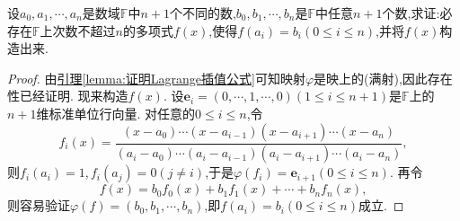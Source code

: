 \documentclass[../../main.tex]{subfiles}%
\begin{document}
\begin{theorem}[Lagrange插值公式]\label{theorem:Lagrange插值公式}
设\(a_0,a_1,\cdots,a_n\)是数域\(\mathbb{F}\)中\(n + 1\)个不同的数,\(b_0,b_1,\cdots,b_n\)是\(\mathbb{F}\)中任意\(n + 1\)个数,求证:必存在\(\mathbb{F}\)上次数不超过\(n\)的多项式\(f(x)\),使得\(f(a_i)=b_i(0\leqslant  i\leqslant  n)\),并将\(f(x)\)构造出来.
\end{theorem}
\begin{proof}
由\hyperref[lemma:证明Lagrange插值公式]{引理\ref{lemma:证明Lagrange插值公式}}可知映射\(\varphi\)是映上的(满射),因此存在性已经证明. 现来构造\(f(x)\). 设\(\boldsymbol{e}_i=(0,\cdots,1,\cdots,0)(1\leqslant  i\leqslant  n + 1)\)是\(\mathbb{F}\)上的\(n + 1\)维标准单位行向量. 对任意的\(0\leqslant  i\leqslant  n\),令
\[
f_i(x)=\frac{(x - a_0)\cdots(x - a_{i - 1})(x - a_{i + 1})\cdots(x - a_n)}{(a_i - a_0)\cdots(a_i - a_{i - 1})(a_i - a_{i + 1})\cdots(a_i - a_n)},
\]
则\(f_i(a_i)=1,f_i(a_j)=0(j\neq i)\),于是\(\varphi(f_i)=\boldsymbol{e}_{i + 1}(0\leqslant  i\leqslant  n)\). 再令
\[
f(x)=b_0f_0(x)+b_1f_1(x)+\cdots + b_nf_n(x),
\]
则容易验证\(\varphi(f)=(b_0,b_1,\cdots,b_n)\),即\(f(a_i)=b_i(0\leqslant  i\leqslant  n)\)成立. \end{proof}
\end{document}

